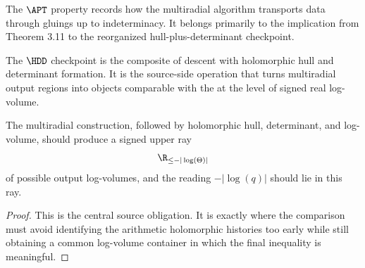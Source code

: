 \begin{definition}
  \label{def:apt}
  \notready
  The \(\APT\) property records how the multiradial algorithm transports data
  through gluings up to indeterminacy.  It belongs primarily to the implication
  from Theorem 3.11 to the reorganized hull-plus-determinant checkpoint.
\end{definition}

\begin{definition}
  \label{def:hdd}
  \notready
  The \(\HDD\) checkpoint is the composite of descent with holomorphic hull
  and determinant formation.  It is the source-side operation that turns
  multiradial output regions into objects comparable with the \qPilot{} at
  the level of signed real log-volume.
\end{definition}

\begin{proposition}
  \label{prop:step-xi-upper-ray-input}
  \notready
  The multiradial construction, followed by holomorphic hull, determinant, and
  log-volume, should produce a signed upper ray
  \[
    \R_{\le -|\log(\Theta)|}
  \]
  of possible output log-volumes, and the \qPilot{} reading
  \(-|\log(q)|\) should lie in this ray.
\end{proposition}

\begin{proof}
  This is the central source obligation.  It is exactly where the comparison
  must avoid identifying the arithmetic holomorphic histories too early while
  still obtaining a common log-volume container in which the final inequality
  is meaningful.
\end{proof}

